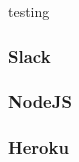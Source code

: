 testing

\subsubsection{Slack}
\label{sec:slack}

\subsubsection{NodeJS}
\label{sec:nodejs}

\subsubsection{Heroku}
\label{sec:heroku}

